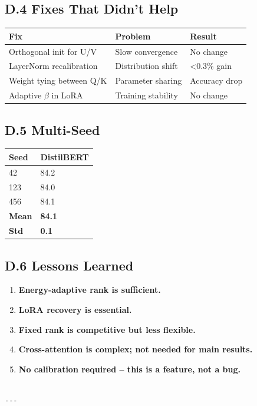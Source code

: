\subsection{D.4 Fixes That Didn't Help}

\begin{table}[H]
\centering
\small
\begin{tabular}{lll}
\toprule
\textbf{Fix} & \textbf{Problem} & \textbf{Result} \\
\midrule
Orthogonal init for U/V & Slow convergence & No change \\
LayerNorm recalibration & Distribution shift & <0.3\% gain \\
Weight tying between Q/K & Parameter sharing & Accuracy drop \\
Adaptive $\beta$ in LoRA & Training stability & No change \\
\bottomrule
\end{tabular}
\end{table}

\subsection{D.5 Multi-Seed}

\begin{table}[H]
\centering
\small
\begin{tabular}{ll}
\toprule
\textbf{Seed} & \textbf{DistilBERT} \\
\midrule
42 & 84.2 \\
123 & 84.0 \\
456 & 84.1 \\
\textbf{Mean} & \textbf{84.1} \\
\textbf{Std} & \textbf{0.1} \\
\bottomrule
\end{tabular}
\end{table}

\subsection{D.6 Lessons Learned}

\begin{enumerate}
\item \textbf{Energy-adaptive rank is sufficient.}
\item \textbf{LoRA recovery is essential.}
\item \textbf{Fixed rank is competitive but less flexible.}
\item \textbf{Cross-attention is complex; not needed for main results.}
\item \textbf{No calibration required -- this is a feature, not a bug.}
\end{enumerate}
\begin{lstlisting}

---
\end{lstlisting}


